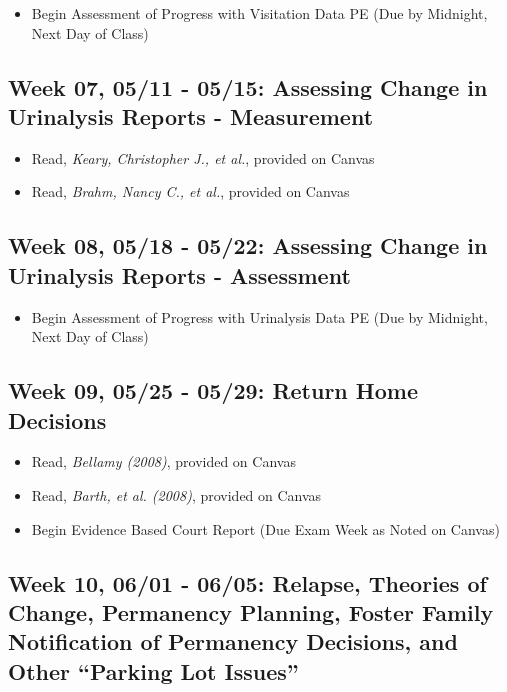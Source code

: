 \documentclass[11pt,]{article}
\providecommand{\tightlist}{%
  \setlength{\itemsep}{0pt}\setlength{\parskip}{0pt}}
\begin{document}
\begin{itemize}
\tightlist
\item
  Begin Assessment of Progress with Visitation Data PE (Due by Midnight,
  Next Day of Class)
\end{itemize}

\subsection{Week 07, 05/11 - 05/15: Assessing Change in Urinalysis
Reports -
Measurement}\label{week-07-0511---0515-assessing-change-in-urinalysis-reports---measurement}

\begin{itemize}
\tightlist
\item
  Read, \emph{Keary, Christopher J., et al.}, provided on Canvas
\item
  Read, \emph{Brahm, Nancy C., et al.}, provided on Canvas
\end{itemize}

\subsection{Week 08, 05/18 - 05/22: Assessing Change in Urinalysis
Reports -
Assessment}\label{week-08-0518---0522-assessing-change-in-urinalysis-reports---assessment}

\begin{itemize}
\tightlist
\item
  Begin Assessment of Progress with Urinalysis Data PE (Due by Midnight,
  Next Day of Class)
\end{itemize}

\subsection{Week 09, 05/25 - 05/29: Return Home
Decisions}\label{week-09-0525---0529-return-home-decisions}

\begin{itemize}
\tightlist
\item
  Read, \emph{Bellamy (2008)}, provided on Canvas
\item
  Read, \emph{Barth, et al. (2008)}, provided on Canvas
\item
  Begin Evidence Based Court Report (Due Exam Week as Noted on Canvas)
\end{itemize}

\subsection{\texorpdfstring{Week 10, 06/01 - 06/05: Relapse, Theories of
Change, Permanency Planning, Foster Family Notification of Permanency
Decisions, and Other ``Parking Lot
Issues''}{Week 10, 06/01 - 06/05: Relapse, Theories of Change, Permanency Planning, Foster Family Notification of Permanency Decisions, and Other Parking Lot Issues}}\label{week-10-0601---0605-relapse-theories-of-change-permanency-planning-foster-family-notification-of-permanency-decisions-and-other-parking-lot-issues}
\end{document}

